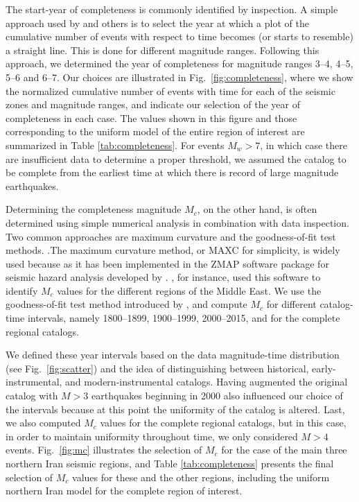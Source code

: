 The start-year of completeness is commonly identified by inspection. A simple approach used by \citet{Frankel1995} and others is to select the year at which a plot of the cumulative number of events with respect to time becomes (or starts to resemble) a straight line. This is done for different magnitude ranges. Following this approach, we determined the year of completeness for magnitude ranges 3--4, 4--5, 5--6 and 6--7. Our choices are illustrated in Fig.~\ref{fig:completeness}, where we show the normalized cumulative number of events with time for each of the seismic zones and magnitude ranges, and indicate our selection of the year of completeness in each case. The values shown in this figure and those corresponding to the uniform model of the entire region of interest are summarized in Table \ref{tab:completeness}. For events $M_w>7$, in which case there are insufficient data to determine a proper threshold, we assumed the catalog to be complete from the earliest time at which there is record of large magnitude earthquakes. 

Determining the completeness magnitude $M_c$, on the other hand, is often determined using simple numerical analysis in combination with data inspection. Two common approaches are maximum curvature and the goodness-of-fit test methods. .The maximum curvature method, or MAXC for simplicity, is widely used because as it has been implemented in the ZMAP software package for seismic hazard analysis developed by \citet{Wiemer2001}. \citet{Zare2014}, for instance, used this software to identify $M_c$ values for the different regions of the Middle East.  We use the goodness-of-fit test method introduced by \citet{Wiemer2000}, and compute $M_c$ for different catalog-time intervals, namely 1800--1899, 1900--1999, 2000--2015, and for the complete regional catalogs.

We defined these year intervals based on the data magnitude-time distribution (see Fig.~\ref{fig:scatter}) and the idea of distinguishing between historical, early-instrumental, and modern-instrumental catalogs. Having augmented the original catalog with $M>3$ earthquakes beginning in 2000 also influenced our choice of the intervals because at this point the uniformity of the catalog is altered. Last, we also computed $M_c$ values for the complete regional catalogs, but in this case, in order to maintain uniformity throughout time, we only considered $M>4$ events. Fig.~\ref{fig:mc} illustrates the selection of $M_c$ for the case of the main three northern Iran seismic regions, and Table \ref{tab:completeness} presents the final selection of $M_c$ values for these and the other regions, including the uniform northern Iran model for the complete region of interest.

